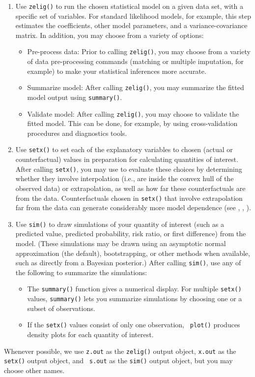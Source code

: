 \begin{enumerate}
\item Use \texttt{zelig()} to run the chosen statistical model on a
given data set, with a specific set of variables.  For standard
likelihood models, for example, this step estimates the coefficients,
other model parameters, and a variance-covariance matrix.  In
addition, you may choose from a variety of options:
\begin{itemize} 
\item Pre-process data:  Prior to calling {\tt zelig()}, you may
  choose from a variety of data pre-processing commands (matching or
  multiple imputation, for example) to make your statistical
  inferences more accurate. 
\item Summarize model: After calling {\tt zelig()}, you may summarize
  the fitted model output using {\tt summary()}.
\item Validate model: After calling {\tt zelig()}, you may choose to
  validate the fitted model. This can be done, for example, by using
  cross-validation procedures and diagnostics tools.
\end{itemize}
\item Use \texttt{setx()} to set each of the explanatory variables to
  chosen (actual or counterfactual) values in preparation for
  calculating quantities of interest.  After calling {\tt setx()}, you
  may use  to evaluate these choices by
  determining whether they involve interpolation (i.e., are inside the
  convex hull of the observed data) or extrapolation, as well as how
  far these counterfactuals are from the data.  Counterfactuals chosen
  in \texttt{setx()} that involve extrapolation far from the data can
  generate considerably more model dependence (see \cite{KinZen06},
  \cite{KinZen07}, \cite{StoKinZen05}).
\item Use \texttt{sim()} to draw simulations of your quantity of
  interest (such as a predicted value, predicted probability, risk
  ratio, or first difference) from the model.  (These simulations may
  be drawn using an asymptotic normal approximation (the default),
  bootstrapping, or other methods when available, such as directly
  from a Bayesian posterior.)  After calling {\tt sim()}, use any of
the following to summarize the simulations:
\begin{itemize}
\item The {\tt summary()} function gives a numerical display. For
multiple {\tt setx()} values, {\tt summary()} lets you summarize
simulations by choosing one or a subset of observations.
\item If the {\tt setx()} values consist of only one observation, {\tt
plot()} produces density plots for each quantity of interest.  
\end{itemize}
\end{enumerate}
Whenever possible, we use {\tt z.out} as the {\tt zelig()} output
object, \texttt{x.out} as the \texttt{setx()} output object, and {\tt
s.out} as the {\tt sim()} output object, but you may choose other
names.

